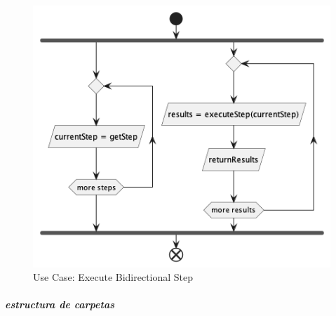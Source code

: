 \begin{figure}[H]
    \centering
    \includegraphics[height=0.2\textheight]{./part/Proyecto_ejecutivo/memoria_descriptiva/descripcionDelProyecto/client/uml/executeBidiStep}
    \caption{Use Case: Execute Bidirectional Step}\label{fig:Use Case-Execute Bidirectional Step}
\end{figure}

\subparagraph{estructura de carpetas}







